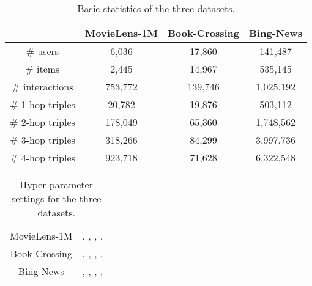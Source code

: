 \documentclass[sigconf]{acmart}
\begin{document}
		
		\begin{table}[t]
			\centering
			\caption{Basic statistics of the three datasets.}
			\begin{tabular}{c|ccc}
				\hline
				& MovieLens-1M & Book-Crossing & Bing-News\\
				\hline
				\# users & 6,036 & 17,860 & 141,487\\
				\# items & 2,445 & 14,967 & 535,145\\
				\# interactions & 753,772 & 139,746 & 1,025,192\\
				\# 1-hop triples & 20,782 & 19,876 & 503,112\\
				\# 2-hop triples & 178,049 & 65,360 & 1,748,562\\
				\# 3-hop triples & 318,266 & 84,299 & 3,997,736\\
				\# 4-hop triples & 923,718 & 71,628 & 6,322,548\\
				\hline
			\end{tabular}
			\vspace{-0.07in}
			\label{table:statistics}
		\end{table}	
		
		\begin{table}[t]
			\centering
			\caption{Hyper-parameter settings for the three datasets.}
			\begin{tabular}{c|c}
				\hline
				MovieLens-1M & , , , , \\
				Book-Crossing & , , , , \\
				Bing-News & , , , , \\
				\hline
			\end{tabular}
			\vspace{-0.07in}
			\label{table:hps}
		\end{table}	
		
\end{document}
